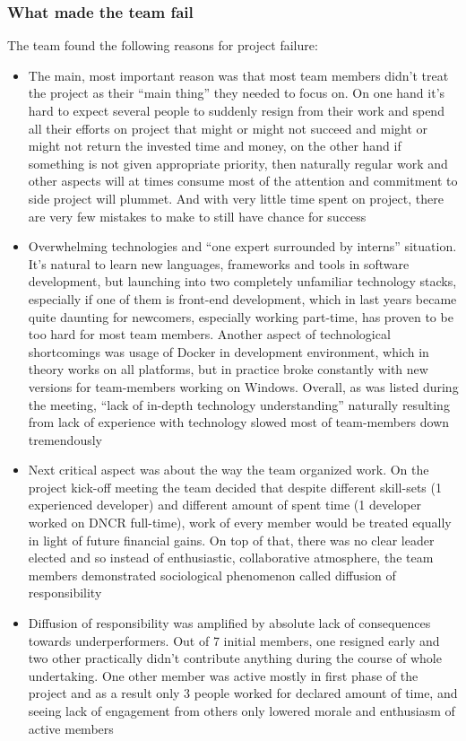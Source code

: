 \documentclass{article}
\begin{document}
\subsubsection{What made the team fail}
The team found the following reasons for project failure:
\begin{itemize}
\item The main, most important reason was that most team members didn't treat the project as their ``main thing'' they needed to focus on. On one hand it's hard to expect several people to suddenly resign from their work and spend all their efforts on project that might or might not succeed and might or might not return the invested time and money, on the other hand if something is not given appropriate priority, then naturally regular work and other aspects will at times consume most of the attention and commitment to side project will plummet. And with very little time spent on project, there are very few mistakes to make to still have chance for success
\item Overwhelming technologies and ``one expert surrounded by interns'' situation. It's natural to learn new languages, frameworks and tools in software development, but launching into two completely unfamiliar technology stacks, especially if one of them is front-end development, which in last years became quite daunting for newcomers, especially working part-time, has proven to be too hard for most team members. Another aspect of technological shortcomings was usage of Docker in development environment, which in theory works on all platforms, but in practice broke constantly with new versions for team-members working on Windows. Overall, as was listed during the meeting, ``lack of in-depth technology understanding'' naturally resulting from lack of experience with technology slowed most of team-members down tremendously
\item Next critical aspect was about the way the team organized work. On the project kick-off meeting the team decided that despite different skill-sets (1 experienced developer) and different amount of spent time (1 developer worked on DNCR full-time), work of every member would be treated equally in light of future financial gains. On top of that, there was no clear leader elected and so instead of enthusiastic, collaborative atmosphere, the team members demonstrated sociological phenomenon called diffusion of responsibility
\item Diffusion of responsibility was amplified by absolute lack of consequences towards underperformers. Out of 7 initial members, one resigned early and two other practically didn't contribute anything during the course of whole undertaking. One other member was active mostly in first phase of the project and as a result only 3 people worked for declared amount of time, and seeing lack of engagement from others only lowered morale and enthusiasm of active members 

\end{itemize}
\end{document}
